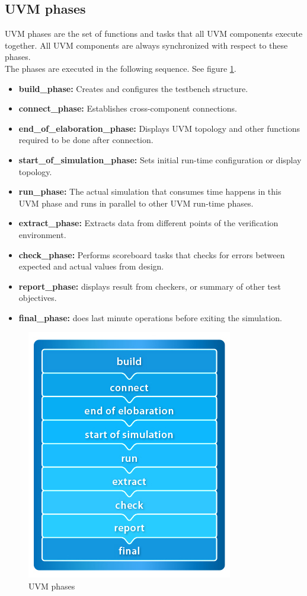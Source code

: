 \documentclass[../main.tex]{subfiles}
\begin{document}
\subsection{UVM phases}
 UVM phases are the set of functions and tasks that all UVM components execute together. All UVM components are always synchronized with respect to these phases.\\
The phases are executed in the following sequence. See figure \ref{fig:uvm_phase}.\\
\begin{itemize}
\item \textbf{build\_phase:} Creates and configures the testbench structure.
\item \textbf {connect\_phase:} Establishes cross-component connections.
\item \textbf {end\_of\_elaboration\_phase:} Displays UVM topology and other functions required to be done after connection.
\item \textbf {start\_of\_simulation\_phase:} Sets initial run-time configuration or display topology.
\item \textbf {run\_phase:} The actual simulation that consumes time happens in this UVM phase and runs in parallel to other UVM run-time phases.
\item \textbf {extract\_phase:} Extracts data from different points of the verification environment.
\item \textbf {check\_phase:} Performs scoreboard tasks that checks for errors between expected and actual values from design.
\item \textbf {report\_phase:} displays result from checkers, or summary of other test objectives.
\item \textbf {final\_phase:} does last minute operations before exiting the simulation.
\end{itemize}
 \begin{figure}[h!]
\centering
\includegraphics[scale = 0.8]{diagrams/uvm_phase_01.jpg}
\caption{UVM phases}
\label{fig:uvm_phase}
\end{figure}
\end{document}
